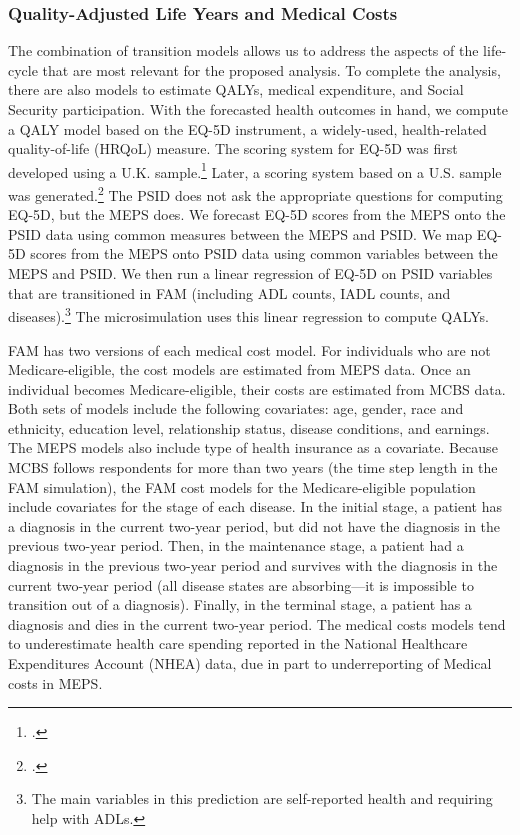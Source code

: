 \subsubsection{Quality-Adjusted Life Years and Medical Costs} \label{section:qalys}

\noindent The combination of transition models allows us to address the aspects of the life-cycle that are most relevant for the proposed analysis. To complete the analysis, there are also models to estimate QALYs, medical expenditure, and Social Security participation. With the forecasted health outcomes in hand, we compute a QALY model based on the EQ-5D instrument, a widely-used, health-related
quality-of-life (HRQoL) measure. The scoring system for EQ-5D was first developed using a U.K. sample.\footnote{\citet{Dolan_1997_Modeling_MC}.} Later, a scoring system based on
a U.S. sample was generated.\footnote{\citet{Shaw_etal_2005_EQ5D_MC}.} The PSID does not ask the appropriate questions for computing EQ-5D, but the MEPS does. We forecast EQ-5D scores from the MEPS onto the PSID data using common measures between the MEPS and PSID. We map EQ-5D scores from the MEPS onto PSID data using common variables between the MEPS and PSID. We then run a linear regression of EQ-5D on PSID variables that are transitioned in FAM (including ADL counts, IADL counts, and diseases).\footnote{The main variables in this prediction are self-reported health and requiring help with ADLs.} The microsimulation uses this linear regression to compute QALYs.

\noindent FAM has two versions of each medical cost model. For individuals who are not Medicare-eligible, the cost models are estimated from MEPS data. Once an individual becomes Medicare-eligible, their costs are estimated from MCBS data. Both sets of models include the following covariates:
age, gender, race and ethnicity, education level, relationship status, disease conditions, and earnings. The MEPS models also include type of health insurance as a covariate. Because MCBS follows respondents for more than two years (the time step length in the FAM simulation), the FAM cost models for the Medicare-eligible population include covariates for the stage of each disease. In the initial stage, a patient has a diagnosis in the current two-year period, but did not have the diagnosis in the previous two-year period. Then, in the maintenance stage, a patient had a diagnosis in the previous two-year period and survives with the diagnosis in the current two-year period (all disease states are absorbing---it is impossible to transition out of a diagnosis). Finally, in the terminal stage, a patient has a diagnosis and dies in the current two-year period. The medical costs models tend to underestimate health care spending reported in the National Healthcare Expenditures Account (NHEA) data, due in part to underreporting of Medical costs in MEPS.

